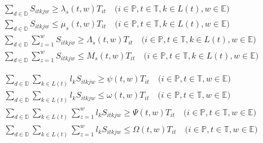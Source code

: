 \documentclass{article}
\begin{document}
\begin{gather}
\sum_{d \in \mathbb{D}}S_{itkjw} \geq \lambda_{s}(t,w)T_{it} \quad \text{($i \in \mathbb{P},t \in \mathbb{T},k \in L(t),w \in \mathbb{E}$)} \label{eqn:S_T_shiftlen_weeklylb} \\
\sum_{d \in \mathbb{D}}S_{itkjw} \leq \mu_{s}(t,w)T_{it} \quad \text{($i \in \mathbb{P},t \in \mathbb{T},k \in L(t),w \in \mathbb{E}$)} \label{eqn:S_T_shiftlen_weeklyub} \\
%
\sum_{d \in \mathbb{D}} \sum_{z=1}^{w} S_{itkjw} \geq \Lambda_{s}(t,w)T_{it} \quad \text{($i \in \mathbb{P},t \in \mathbb{T},k \in L(t),w \in \mathbb{E}$)} \label{eqn:S_T_cum_shiftlen_weeklylb} \\
\sum_{d \in \mathbb{D}} \sum_{z=1}^{w} S_{itkjw} \leq M_{s}(t,w)T_{it} \quad \text{($i \in \mathbb{P},t \in \mathbb{T},k \in L(t),w \in \mathbb{E}$)} \label{eqn:S_T_cum_shiftlen_weeklyub} 
%
\end{gather} 

\begin{gather}
\sum_{d \in \mathbb{D}}\sum_{k \in L(t)}l_k S_{itkjw} \geq \psi(t,w)T_{it} \quad \text{($i \in \mathbb{P},t \in \mathbb{T},w \in \mathbb{E}$)} \label{eqn:S_T_weeklylb_periods} \\
\sum_{d \in \mathbb{D}}\sum_{k \in L(t)}l_k S_{itkjw} \leq \omega(t,w)T_{it} \quad \text{($i \in \mathbb{P},t \in \mathbb{T},w \in \mathbb{E}$)} \label{eqn:S_T_weeklyub_periods} \\
%
\sum_{d \in \mathbb{D}}\sum_{k \in L(t)}\sum_{z=1}^{w}l_k S_{itkjw} \geq \Psi(t,w)T_{it} \quad \text{($i \in \mathbb{P},t \in \mathbb{T},w \in \mathbb{E}$)} \label{eqn:S_T_cum_weeklylb_periods} \\
\sum_{d \in \mathbb{D}}\sum_{k \in L(t)}\sum_{z=1}^{w}l_k S_{itkjw} \leq \Omega(t,w)T_{it} \quad \text{($i \in \mathbb{P},t \in \mathbb{T},w \in \mathbb{E}$)} \label{eqn:S_T_cum_weeklyub_periods} 
%
\end{gather} 
\end{document}
